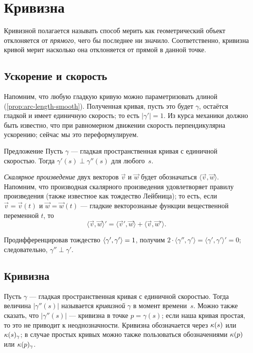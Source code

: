 \chapter{Кривизна}
\label{chap:curve-curvature}



Кривизной полагается называть способ мерить как геометрический объект отклоняется от \textit{прямого}, чего бы последнее ни значило.
Соответственно, кривизна кривой мерит насколько она отклоняется от прямой в данной точке.


\section{Ускорение и скорость}

Напомним, что любую гладкую кривую можно параметризовать длиной (\ref{prop:arc-length-smooth}).
Полученная кривая, пусть это будет $\gamma$, остаётся гладкой и имеет единичную скорость;
то есть $|\gamma'|=1$.
Из курса механики должно быть известно, что при равномерном движении скорость перпендикулярна ускорению;
сейчас мы это переформулируем.


\begin{thm}{Предложение}\label{prop:a'-pertp-a''}
Пусть $\gamma$ --- гладкая пространственная кривая с единичной скоростью.
Тогда $\gamma'(s)\perp \gamma''(s)$ для любого~$s$.
\end{thm}

\emph{Скалярное произведение} двух векторов $\vec v$ и $\vec w$ будет обозначаться $\langle \vec v,\vec w\rangle$.
Напомним, что производная скалярного произведения удовлетворяет правилу произведения (также известное как тождество Лейбница);
то есть, если $\vec v=\vec v(t)$ и $\vec w=\vec w(t)$ --- гладкие векторознаные функции вещественной переменной $t$, то
\[\langle \vec v,\vec w\rangle'=\langle \vec v',\vec w\rangle+\langle \vec v,\vec w'\rangle.\]

Продифференцировав тождество $\langle\gamma',\gamma'\rangle\z=1$, получим
$2\cdot \langle\gamma'',\gamma' \rangle=\langle\gamma',\gamma'\rangle'=0$;
следовательно, $\gamma''\perp\gamma'$.
\qeds

\section{Кривизна}\label{sec:curvature}

Пусть $\gamma$ --- гладкая пространственная кривая с единичной скоростью.
Тогда величина $|\gamma''(s)|$ называется \emph{кривизной} $\gamma$ в момент времени~$s$.
Можно также сказать, что $|\gamma''(s)|$ --- кривизна в точке $p=\gamma(s)$;
если наша кривая простая, то это не приводит к неоднозначности.
Кривизна обозначается через $\kappa(s)$ или $\kappa(s)_\gamma$;
в случае простых кривых можно также пользоваться обозначениями $\kappa(p)$ или $\kappa(p)_\gamma$.

